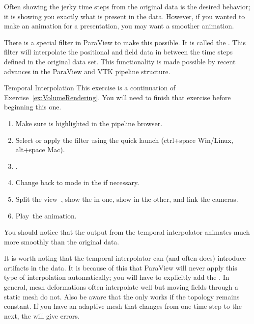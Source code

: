 Often showing the jerky time steps from the original data is the desired
behavior; it is showing you exactly what is present in the data.  However,
if you wanted to make an animation for a presentation, you may want a
smoother animation.

There is a special filter in ParaView to make this possible.  It is called
the .  This filter will interpolate the
positional and field data in between the time steps defined in the original
data set.  This functionality is made possible by recent advances in the
ParaView and VTK pipeline structure.

\begin{exercise}{Temporal Interpolation}
  \label{ex:TemporalInterpolation}%
  This exercise is a continuation of Exercise~\ref{ex:VolumeRendering}.
  You will need to finish that exercise before beginning this one.

  \begin{enumerate}
  \item Make sure  is highlighted in the pipeline browser.
  \item Select  \ra {} \ra {} or apply the  filter using the
    quick launch (ctrl+space Win/Linux, alt+space Mac).
  \item \apply.
  \item Change back to  mode in the  if necessary.
  \item Split the view~\splitViewH, show the  in
    one, show  in the other, and link the cameras.
  \item Play~\vcrPlay the animation.
  \end{enumerate}

  You should notice that the output from the temporal interpolator animates
  much more smoothly than the original data.
\end{exercise}

It is worth noting that the temporal interpolator can (and often does)
introduce artifacts in the data.  It is because of this that ParaView will
never apply this type of interpolation automatically; you will have to
explicitly add the .  In general, mesh
deformations often interpolate well but moving fields through a static mesh
do not.  Also be aware that the  only works if
the topology remains constant.  If you have an adaptive mesh that changes
from one time step to the next, the  will give
errors.


